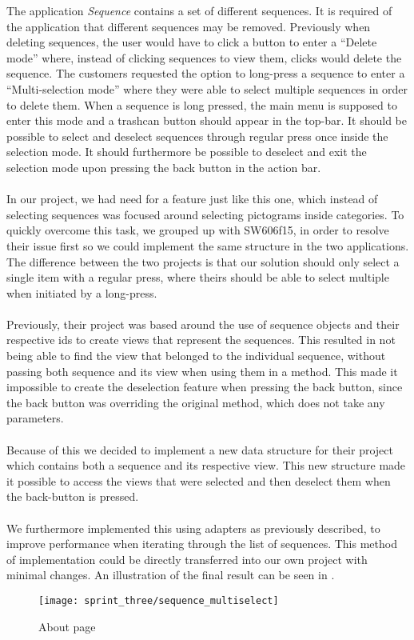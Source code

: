 The application \emph{Sequence} contains a set of different sequences. It is required of the application that different sequences may be removed. Previously when deleting sequences, the user would have to click a button to enter a ``Delete mode'' where, instead of clicking sequences to view them, clicks would delete the sequence. The customers requested the option to long-press a sequence to enter a ``Multi-selection mode'' where they were able to select multiple sequences in order to delete them. When a sequence is long pressed, the main menu is supposed to enter this mode and a trashcan button should appear in the top-bar. It should be possible to select and deselect sequences through regular press once inside the selection mode. It should furthermore be possible to deselect and exit the selection mode upon pressing the back button in the action bar.
\\\\
In our project, we had need for a feature just like this one, which instead of selecting sequences was focused around selecting pictograms inside categories. To quickly overcome this task, we grouped up with SW606f15, in order to resolve their issue first so we could implement the same structure in the two applications. The difference between the two projects is that our solution should only select a single item with a regular press, where theirs should be able to select multiple when initiated by a long-press.
\\\\
Previously, their project was based around the use of sequence objects and their respective ids to create views that represent the sequences. This resulted in not being able to find the view that belonged to the individual sequence, without passing both sequence and its view when using them in a method. This made it impossible to create the deselection feature when pressing the back button, since the back button was overriding the original  method, which does not take any parameters.
\\\\ 
Because of this we decided to implement a new data structure for their project which contains both a sequence and its respective view. This new structure made it possible to access the views that were selected and then deselect them when the back-button is pressed. 
\\\\
We furthermore implemented this using adapters as previously described, to improve performance when iterating through the list of sequences. This method of implementation could be directly transferred into our own project with minimal changes. An illustration of the final result can be seen in .

\begin{figure}[!htbp]
	\centering
	\texttt{[image: sprint\_three/sequence\_multiselect]}
	\caption{About page}
	\label{fig:sequence_multiselect}
\end{figure}